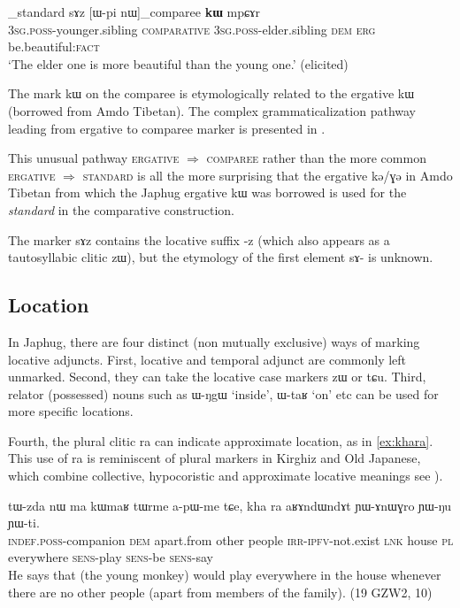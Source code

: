 \documentclass[oldfontcommands,oneside,a4paper,11pt]{article}
\newcommand{\ipa}[1]{\mbox{\phon #1}} %
\begin{document}
\begin{exe}
\ex \label{ex:comp1}
\gll  [\ipa{ɯ-ʁi}]_{standard}   	\ipa{sɤz}   	[\ipa{ɯ-pi}   	\ipa{nɯ}]_{comparee}   	\ipa{\textbf{kɯ}}   	\ipa{mpɕɤr}     \\
\textsc{3sg.poss}-younger.sibling \textsc{comparative} \textsc{3sg.poss}-elder.sibling \textsc{dem} \textsc{erg}  be.beautiful:\textsc{fact} \\
\glt `The elder one is more beautiful than the young one.' (elicited)
\end{exe}

The mark \ipa{kɯ} on the comparee is etymologically related to the ergative \ipa{kɯ} (borrowed from Amdo Tibetan). The complex grammaticalization pathway leading from ergative to comparee marker is presented in \citet{jacques16comparative}. 

This unusual pathway \textsc{ergative} $\Rightarrow$ \textsc{comparee} rather than the more common \textsc{ergative} $\Rightarrow$ \textsc{standard} is all the more surprising that the ergative \ipa{kə/ɣə} in Amdo Tibetan from which the Japhug ergative \ipa{kɯ} was borrowed is used for the \textit{standard} in the comparative construction.

The marker \ipa{sɤz} contains the locative suffix \ipa{-z} (which also appears as a tautosyllabic clitic \ipa{zɯ}), but the etymology of the first element \ipa{sɤ-} is unknown. 

 \subsection{Location}   \label{sec:loc}
In Japhug, there are four distinct (non mutually exclusive) ways of marking locative adjuncts. First, locative and temporal adjunct are commonly left unmarked. Second, they can  take the locative case markers \ipa{zɯ} or \ipa{tɕu}. Third, relator (possessed) nouns such as \ipa{ɯ-ŋgɯ} `inside', \ipa{ɯ-taʁ} `on' etc can be used for more specific locations. 

Fourth, the plural clitic \ipa{ra} can indicate approximate location, as in \ref{ex:khara}. This use of \ipa{ra} is reminiscent of plural markers in Kirghiz and Old Japanese, which combine collective, hypocoristic and approximate locative meanings see \citealt[195]{antonov07ra}).

\begin{exe}
\ex \label{ex:khara}
\gll
\ipa{tɯ-zda} 	\ipa{nɯ} 	\ipa{ma} 	\ipa{kɯmaʁ} 	\ipa{tɯrme} 	\ipa{a-pɯ-me} 	\ipa{tɕe,} 	\ipa{kha} 	\ipa{ra} 	\ipa{aʁɤndɯndɤt} \ipa{ɲɯ-ɤnɯɣro} 	\ipa{ɲɯ-ŋu} 	\ipa{ɲɯ-ti.} \\
\textsc{indef.poss}-companion \textsc{dem} apart.from other people \textsc{irr-ipfv}-not.exist \textsc{lnk} house \textsc{pl} everywhere \textsc{sens}-play \textsc{sens}-be \textsc{sens}-say \\
\glt He says that (the young monkey) would play everywhere in the house whenever there are no other people (apart from members of the family). (19 GZW2, 10)
\end{exe}
\end{document}
